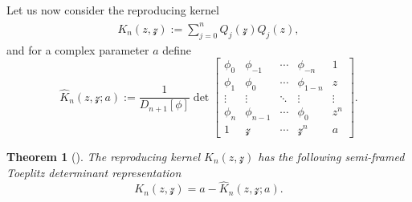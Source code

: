 \documentclass[10pt,a4paper]{amsart}
\numberwithin{equation}{section}
\newtheorem{Theorem}{Theorem}[section]
\begin{document}
Let us now consider the reproducing kernel
		\begin{gather*}%
			K_{n}(z,\mathcal{z}) := \sum_{j=0}^{n} Q_{j}(\mathcal{z})\widehat{Q}_{j}(z),
		\end{gather*}
		and for a complex parameter $a$ define
		\begin{equation}\label{ReproducingKer}
			\widehat{K}_{n}(z,\mathcal{z};a) := \frac{1}{D_{n+1}[\phi]}\det
			\begin{bmatrix}
				\phi_{0} & \phi_{-1} & \cdots & \phi_{-n} & 1\\
				\phi_{1} & \phi_{0} & \cdots & \phi_{1-n} & z\\
				\vdots & \vdots & \ddots & \vdots & \vdots\\
				\phi_{n} & \phi_{n-1} & \cdots & \phi_{0} & z^{n} \\
				1 & \mathcal{z} & \cdots & \mathcal{z}^{n} & a
			\end{bmatrix}.
		\end{equation}
		\begin{Theorem}[\cite{GW}]\label{Rep Ker Semi Framed}
			The reproducing kernel $K_{n}(z,\mathcal{z})$ has the following semi-framed Toeplitz determinant representation 		\begin{equation}\label{repKer to semi-framed}
				K_{n}(z,\mathcal{z}) = a - \widehat{K}_{n}(z,\mathcal{z};a).
			\end{equation}
			
		\end{Theorem}
\end{document}
